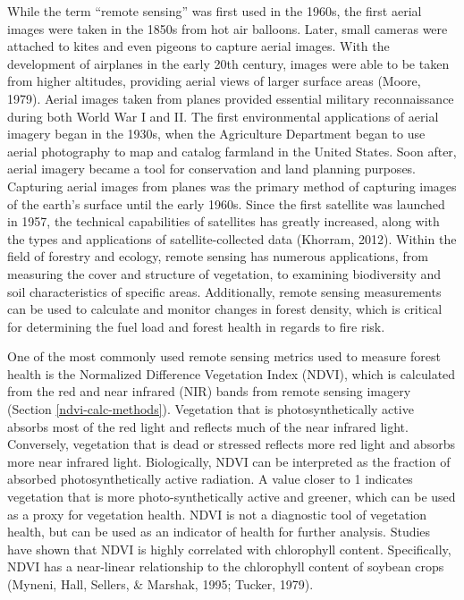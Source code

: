 \documentclass[12pt,twoside]{reedthesis}
\begin{document}
While the term ``remote sensing'' was first used in the 1960s, the first
aerial images were taken in the 1850s from hot air balloons. Later,
small cameras were attached to kites and even pigeons to capture aerial
images. With the development of airplanes in the early 20th century,
images were able to be taken from higher altitudes, providing aerial
views of larger surface areas (Moore, 1979). Aerial images taken from
planes provided essential military reconnaissance during both World War
I and II. The first environmental applications of aerial imagery began
in the 1930s, when the Agriculture Department began to use aerial
photography to map and catalog farmland in the United States. Soon
after, aerial imagery became a tool for conservation and land planning
purposes. Capturing aerial images from planes was the primary method of
capturing images of the earth's surface until the early 1960s. Since the
first satellite was launched in 1957, the technical capabilities of
satellites has greatly increased, along with the types and applications
of satellite-collected data (Khorram, 2012). Within the field of forestry
and ecology, remote sensing has numerous applications, from measuring
the cover and structure of vegetation, to examining biodiversity and
soil characteristics of specific areas. Additionally, remote sensing
measurements can be used to calculate and monitor changes in forest
density, which is critical for determining the fuel load and forest
health in regards to fire risk.

One of the most commonly used remote sensing metrics used to measure
forest health is the Normalized Difference Vegetation Index (NDVI),
which is calculated from the red and near infrared (NIR) bands from
remote sensing imagery (Section \ref{ndvi-calc-methods}). Vegetation
that is photosynthetically active absorbs most of the red light and
reflects much of the near infrared light. Conversely, vegetation that is
dead or stressed reflects more red light and absorbs more near infrared
light. Biologically, NDVI can be interpreted as the fraction of absorbed
photosynthetically active radiation. A value closer to 1 indicates
vegetation that is more photo-synthetically active and greener, which
can be used as a proxy for vegetation health. NDVI is not a diagnostic
tool of vegetation health, but can be used as an indicator of health for
further analysis. Studies have shown that NDVI is highly correlated with
chlorophyll content. Specifically, NDVI has a near-linear relationship
to the chlorophyll content of soybean crops (Myneni, Hall, Sellers, \& Marshak, 1995; Tucker, 1979).
\end{document}
